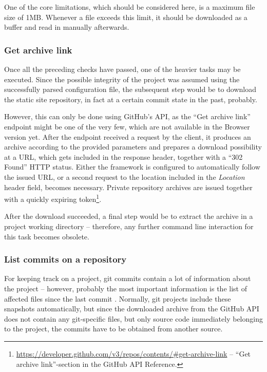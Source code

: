 One of the core limitations, which should be considered here, is a maximum file size of 1MB. Whenever a file exceeds this limit, it should be downloaded as a buffer and read in manually afterwards.

\subsubsection{Get archive link}
Once all the preceding checks have passed, one of the heavier tasks may be executed. Since the possible integrity of the project was assumed using the successfully parsed configuration file, the subsequent step would be to download the static site repository, in fact at a certain commit state in the past, probably.

However, this can only be done using GitHub's API, as the ``Get archive link'' endpoint might be one of the very few, which are not available in the Browser version yet. After the endpoint received a request by the client, it produces an archive according to the provided parameters and prepares a download possibility at a URL, which gets included in the response header, together with a ``302 Found'' HTTP status. Either the framework is configured to automatically follow the issued URL, or a second request to the location included in the \emph{Location} header field, becomes necessary. Private repository archives are issued together with a quickly expiring token\footnote{\url{https://developer.github.com/v3/repos/contents/\#get-archive-link} -- ``Get archive link''-section in the GitHub API Reference.}.

After the download succeeded, a final step would be to extract the archive in a project working directory -- therefore, any further command line interaction for this task becomes obsolete.

\subsubsection{List commits on a repository}
For keeping track on a project, git commits contain a lot of information about the project -- however, probably the most important information is the list of affected files since the last commit \cite[65]{loeliger2012version}. Normally, git projects include these snapshots automatically, but since the downloaded archive from the GitHub API does not contain any git-specific files, but only source code immediately belonging to the project, the commits have to be obtained from another source.

